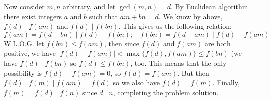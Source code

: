 \documentclass[11pt,a4paper]{article}
\begin{document}
\begin{enumerate}
	Now consider $m, n$ arbitrary, and let $\gcd(m, n)=d$. By Euclidean algorithm there exist integers $a$ and $b$ such that $am+bn=d$. We know by above, $f(d)\mid f(am)$ and $f(d)\mid f(bn)$. This gives us the following relation: 
	\[f(am)=f(d-bn)\mid f(d)-f(bn);\quad
	  f(bn)=f(d-am)\mid f(d)-f(am)
	\]
	W.L.O.G. let $f(bn)\le f(am)$, then since $f(d)$ and $f(am)$ are both positive, we have $|f(d)-f(am)|<\max\{f(d), f(am)\}\le f(bn)$ (we have $f(d)\mid f(bn)$ so $f(d)\le f(bn)$, too. This means that the only possibility is $f(d)-f(am)=0$, so $f(d)=f(am)$. But then $f(d)\mid f(m)\mid f(am)=f(d)$ so we also have $f(d)=f(m)$. Finally, $f(m)=f(d)\mid f(n)$ since $d\mid n$, completing the problem solution. 
	
\end{enumerate}
\end{document}
